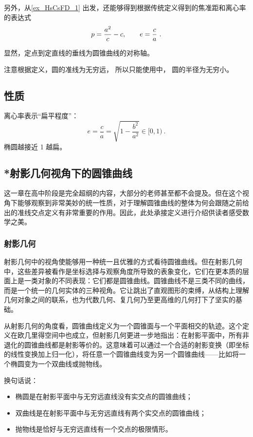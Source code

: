 另外，从\autoref{ex_HsCsFD_1} 出发，还能够得到根据传统定义得到的焦准距和离心率的表达式
\begin{equation}
p={a^2\over c}-c,\qquad e={c\over a}~.
\end{equation}


显然，定点到定直线的垂线为圆锥曲线的对称轴。

注意根据定义，圆的准线为无穷远， 所以只能使用中， 圆的半径为无穷小。
\subsection{性质}

离心率表示“扁平程度”：
$$ e = \frac{c}{a} = \sqrt{1 - \frac{b^2}{a^2}} \in [0, 1) ~.$$
椭圆越接近 1 越扁。

\subsection{*射影几何视角下的圆锥曲线}\label{sub_HsCsFD_1}

这一章在高中阶段是完全超纲的内容，大部分的老师甚至都不会提及。但在这个视角下能够观察到非常美妙的统一性质，对于理解圆锥曲线的整体为何会跟随之前给出的准线交点定义有非常重要的作用。因此，此处承接定义进行介绍供读者感受数学之美。


\subsubsection{射影几何}



射影几何中的视角使能够用一种统一且优雅的方式看待圆锥曲线。但在射影几何中，这些差异被看作是坐标选择与观察角度所导致的表象变化，它们在更本质的层面上是一类对象的不同表现：它们都是圆锥曲线。圆锥曲线不是三类不同的曲线，而是一个统一的几何实体的三种视角。它让跳出了直观图形的束缚，从结构上理解几何对象之间的联系，也为代数几何、复几何乃至更高维的几何打下了坚实的基础。

从射影几何的角度看，圆锥曲线定义为一个圆锥面与一个平面相交的轨迹。这个定义在欧几里得空间中也成立，但射影几何更进一步地指出：在射影平面中，所有非退化的圆锥曲线都是射影等价的。这意味着可以通过一个合适的射影变换（即坐标的线性变换加上归一化），将任意一个圆锥曲线变为另一个圆锥曲线——比如将一个椭圆变为一个双曲线或抛物线。

换句话说：
\begin{itemize}
\item 椭圆是在射影平面中与无穷远直线没有实交点的圆锥曲线；
\item 双曲线是在射影平面中与无穷远直线有两个实交点的圆锥曲线；
\item 抛物线是恰好与无穷远直线有一个交点的极限情形。
\end{itemize}

